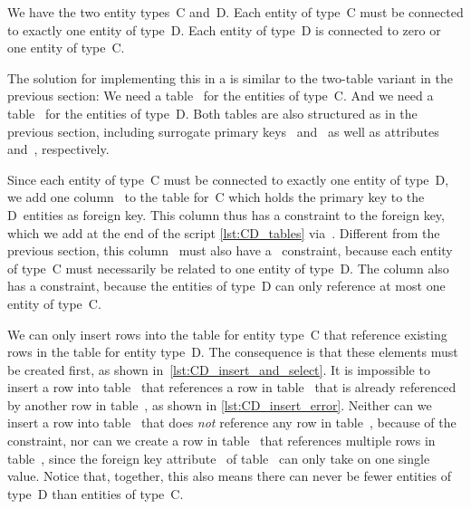 %
\label{sec:rm:cd}%
%
%
%
%
%
%
%
We have the two entity types~C and~D.
Each entity of type~C must be connected to exactly one entity of type~D.
Each entity of type~D is connected to zero or one entity of type~C.

The solution for implementing this in a  is similar to the two-table variant in the previous section:
We need a table~ for the entities of type~C.
And we need a table~ for the entities of type~D.
Both tables are also structured as in the previous section, including surrogate primary keys~ and~ as well as attributes~ and~, respectively.

Since each entity of type~C must be connected to exactly one entity of type~D, we add one column~ to the table for~C which holds the primary key to the D~entities as foreign key.
This column thus has a  constraint to the foreign key, which we add at the end of the script \cref{lst:CD_tables} via~.
Different from the previous section, this column~ must also have a ~constraint, because each entity of type~C must necessarily be related to one entity of type~D.
The column also has a  constraint, because the entities of type~D can only reference at most one entity of type~C.

We can only insert rows into the table for entity type~C that reference existing rows in the table for entity type~D.
The consequence is that these elements must be created first, as shown in~\cref{lst:CD_insert_and_select}.
It is impossible to insert a row into table~ that references a row in table~ that is already referenced by another row in table~, as shown in \cref{lst:CD_insert_error}.
Neither can we insert a row into table~ that does \emph{not} reference any row in table~, because of the  constraint, nor can we create a row in table~ that references multiple rows in table~, since the foreign key attribute~ of table~ can only take on one single value.
Notice that, together, this also means there can never be fewer entities of type~D than entities of type~C.%
%
\FloatBarrier%
\endhsection%
%

